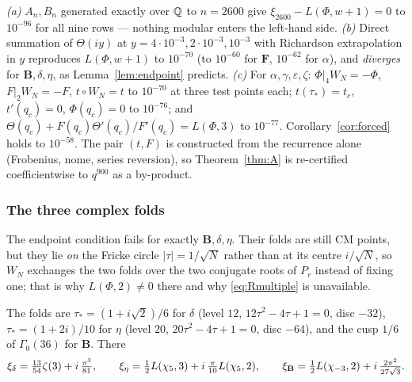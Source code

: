 \begin{verification}\label{ver:thmBexact}
\emph{(a)} $A_n,B_n$ generated exactly over $\mathbb{Q}$ to $n=2600$ give
$\xi_{2600}-L(\Phi,w+1)=0$ to $10^{-96}$ for all nine rows --- nothing modular
enters the left-hand side.
\emph{(b)} Direct summation of $\Theta(iy)$ at $y=4\cdot10^{-3},2\cdot10^{-3},
10^{-3}$ with Richardson extrapolation in $y$ reproduces $L(\Phi,w+1)$ to
$10^{-70}$ (to $10^{-60}$ for $\mathbf F$, $10^{-62}$ for $\alpha$), and
\emph{diverges} for $\mathbf B,\delta,\eta$, as Lemma~\ref{lem:endpoint}
predicts.
\emph{(c)} For $\alpha,\gamma,\varepsilon,\zeta$: $\Phi|_4W_N=-\Phi$,
$F|_2W_N=-F$, $t\circ W_N=t$ to $10^{-70}$ at three test points each;
$t(\tau_*)=t_c$, $t'(q_c)=0$, $\Phi(q_c)=0$ to $10^{-76}$; and
$\Theta(q_c)+F(q_c)\Theta'(q_c)/F'(q_c)=L(\Phi,3)$ to $10^{-77}$.
Corollary~\ref{cor:forced} holds to $10^{-58}$.
The pair $(t,F)$ is constructed from the recurrence alone (Frobenius, nome,
series reversion), so Theorem~\ref{thm:A} is re-certified coefficientwise to
$q^{900}$ as a by-product.
\end{verification}

\subsubsection*{The three complex folds}

The endpoint condition fails for exactly $\mathbf B,\delta,\eta$.  Their folds
are still CM points, but they lie \emph{on} the Fricke circle
$|\tau|=1/\sqrt N$ rather than at its centre $i/\sqrt N$, so $W_N$ exchanges
the two folds over the two conjugate roots of $P_r$ instead of fixing one; that
is why $L(\Phi,2)\neq0$ there and why \eqref{eq:Rmultiple} is unavailable.

\begin{verification}\label{ver:complexexact}
The folds are $\tau_*=(1+i\sqrt2)/6$ for $\delta$ (level $12$, $12\tau^2-4\tau+1=0$,
disc $-32$), $\tau_*=(1+2i)/10$ for $\eta$ (level $20$, $20\tau^2-4\tau+1=0$,
disc $-64$), and the cusp $1/6$ of $\Gamma_0(36)$ for $\mathbf B$.  There
\[
\xi_\delta=\tfrac{13}{54}\zeta(3)+i\,\tfrac{\pi^3}{81},\qquad
\xi_\eta=\tfrac12L(\chi_5,3)+i\,\tfrac{\pi}{10}L(\chi_5,2),\qquad
\xi_{\mathbf B}=\tfrac12L(\chi_{-3},2)+i\,\tfrac{2\pi^2}{27\sqrt3}.
\]
\end{verification}

